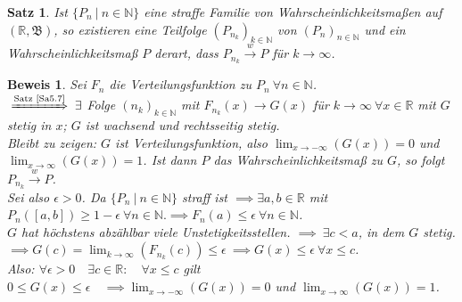 \documentclass[a4paper,11pt]{book}
\newcommand{\R}{{\mathbb R}}
\newcommand{\N}{{\mathbb N}}
\def\BB{ \mathfrak{B} }
\def\folgt{\ensuremath{\implies}}
\newcommand{\folgtnach}[1]{\ensuremath{\DOTSB\;\xRightarrow{\text{#1}}\;}}
\def\wto{\stackrel{w}{\rightarrow}}
\newtheorem{Sa}{Satz}[chapter]
\theoremstyle{nonumberplain}
\newtheorem{Bew}{Beweis}
\begin{document}
\begin{Sa}
Ist $\{P_n\ |\ n\in\N\}$ eine straffe Familie von Wahrscheinlichkeitsmaßen auf $(\R,\BB)$, so existieren eine Teilfolge $(P_{n_k})_{k\in\N}$ von $(P_n)_{n\in\N}$ und ein Wahrscheinlichkeitsmaß $P$ derart, dass $P_{n_k} \wto P$ für $k\to\infty$.
\end{Sa}
\begin{Bew}
Sei $F_n$ die Verteilungsfunktion zu $P_n \ \forall n\in\N$. \\
$\folgtnach{Satz \ref{Sa5.7}} \exists$ Folge $(n_k)_{k\in\N}$ mit $F_{n_k}(x) \to G(x)$ für $k\to\infty \ \forall x\in\R$ mit $G$ stetig in $x$; $G$ ist wachsend und rechtsseitig stetig. \\
Bleibt zu zeigen: $G$ ist Verteilungsfunktion, also $\lim_{x\to -\infty}(G(x)) = 0$ und $\lim_{x\to\infty}(G(x)) = 1$. Ist dann $P$ das Wahrscheinlichkeitsmaß zu $G$, so folgt $P_{n_k} \wto P$. \\
Sei also $\epsilon>0$. Da $\{P_n\ |\ n\in\N\}$ straff ist $\folgt \exists a,b\in\R$ mit $P_n([a,b]) \geq 1-\epsilon \ \forall n\in\N. \folgt F_n(a) \leq \epsilon \ \forall n\in\N$. \\
$G$ hat höchstens abzählbar viele Unstetigkeitsstellen. $\folgt \ \exists c<a$, in dem $G$ stetig. $\folgt G(c) = \lim_{k\to\infty}(F_{n_k}(c)) \leq \epsilon \ \folgt G(x) \leq \epsilon \ \forall x\leq c$. \\
Also: $\forall \epsilon>0 \quad\exists c\in\R: \quad\forall x\leq c$ gilt $0 \leq G(x) \leq \epsilon \quad\folgt \lim_{x\to -\infty}(G(x)) = 0$ und $\lim_{x\to\infty}(G(x)) = 1$.
\end{Bew}
\end{document}

